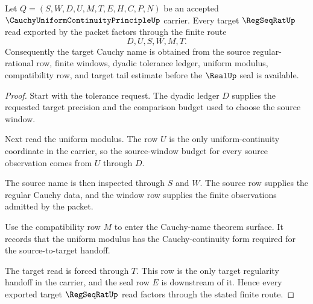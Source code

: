 \begin{theorem}
\label{thm:cauchy-uniform-continuity-principle-finite-handoff}
Let $Q=(S,W,D,U,M,T,E,H,C,P,N)$ be an accepted $\CauchyUniformContinuityPrincipleUp$ carrier. Every target $\RegSeqRatUp$ read exported by the packet factors through the finite route
$$
D,U,S,W,M,T .
$$
Consequently the target Cauchy name is obtained from the source regular-rational row, finite windows, dyadic tolerance ledger, uniform modulus, compatibility row, and target tail estimate before the $\RealUp$ seal is available.
\end{theorem}
\begin{proof}
Start with the tolerance request. The dyadic ledger $D$ supplies the requested target precision and the comparison budget used to choose the source window.

Next read the uniform modulus. The row $U$ is the only uniform-continuity coordinate in the carrier, so the source-window budget for every source observation comes from $U$ through $D$.

The source name is then inspected through $S$ and $W$. The source row supplies the regular Cauchy data, and the window row supplies the finite observations admitted by the packet.

Use the compatibility row $M$ to enter the Cauchy-name theorem surface. It records that the uniform modulus has the Cauchy-continuity form required for the source-to-target handoff.

The target read is forced through $T$. This row is the only target regularity handoff in the carrier, and the seal row $E$ is downstream of it. Hence every exported target $\RegSeqRatUp$ read factors through the stated finite route.
\end{proof}

